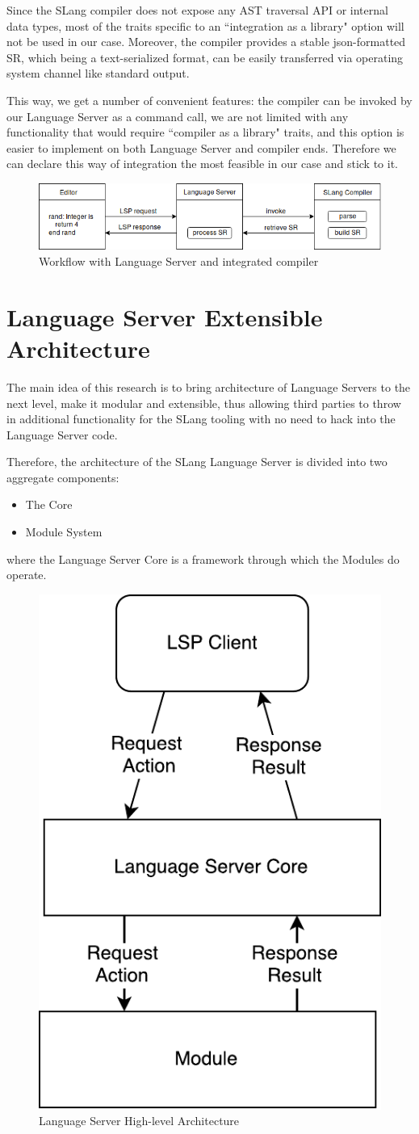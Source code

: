 Since the SLang\cite{Zouev2017} compiler does not expose any AST traversal API or internal data types, most of 
the traits specific to an ``integration as a library" option will not be used in our case.
Moreover, the compiler provides a stable json-formatted SR, which being a text-serialized format, 
can be easily transferred via operating system channel like standard output\cite{TheOpenGroup1997}.

This way, we get a number of convenient features: the compiler can be invoked by our Language Server as a command call, we are not limited 
with any functionality that would require ``compiler as a library" traits, and this option
is easier to implement on both Language Server and compiler ends.
Therefore we can declare this way of integration the most feasible in our case and stick to it.

\begin{figure}[H]
    \centering
    \includegraphics[width=1.0\textwidth]{figs/compiler_integration.png}
    \caption{Workflow with Language Server and integrated compiler}
\end{figure}

\section{Language Server Extensible Architecture}
\label{sec:met:arch}
The main idea of this research is to bring architecture of Language Servers to the next level,
make it modular and extensible, thus allowing third parties to throw in additional functionality for the SLang tooling
with no need to hack into the Language Server code.

Therefore, the architecture of the SLang Language Server is divided into two aggregate components:
\begin{itemize}
    \item The Core
    \item Module System 
\end{itemize}
where the Language Server Core is a framework through which the Modules do operate.

\begin{figure}[H]
    \centering
    \includegraphics[width=.3\textwidth]{figs/highlevel_architecture.pdf}
    \caption{Language Server High-level Architecture}
\end{figure}

